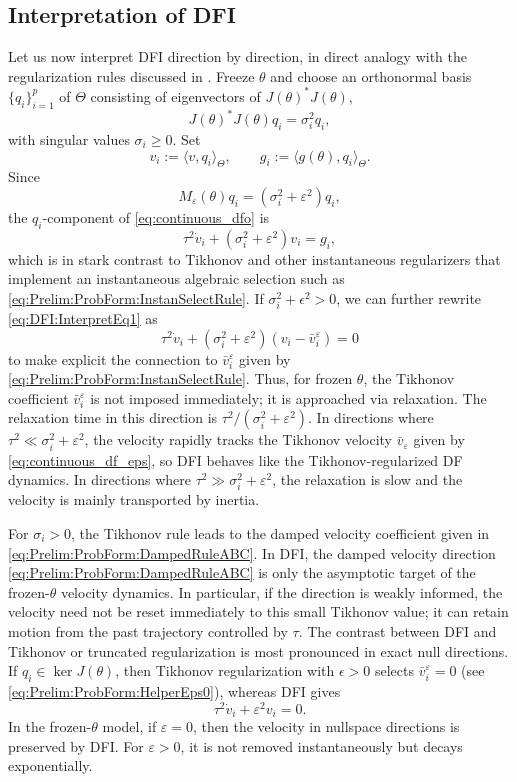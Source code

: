 \documentclass[oneside,11pt]{article}
\theoremstyle{remark}
\theoremstyle{thmstyleone}
\theoremstyle{thmstylethree}
\theoremstyle{thmstyletwo}
\newcommand{\ip}[2]{\langle #1,#2\rangle}
\begin{document}
\subsection{Interpretation of DFI}\label{sec:DFI:Interpretation}
Let us now interpret DFI direction by direction, in direct analogy with the regularization rules discussed in .  
Freeze $\theta$ and choose an orthonormal basis $\{q_i\}_{i=1}^p$ of $\Theta$ consisting of eigenvectors of $J(\theta)^*J(\theta)$,
\[
J(\theta)^*J(\theta)q_i=\sigma_i^2q_i,
\]
with singular values $\sigma_i\ge 0$. 
Set
\[
  v_i:=\ip{v}{q_i}_\Theta,
  \qquad
  g_i:=\ip{g(\theta)}{q_i}_\Theta .
\]
Since
\[
  M_\varepsilon(\theta)q_i=(\sigma_i^2+\varepsilon^2)q_i,
\]
the $q_i$-component of \eqref{eq:continuous_dfo} is
\begin{equation}\label{eq:DFI:InterpretEq1}
  \tau^2 \dot v_i+(\sigma_i^2+\varepsilon^2)v_i=g_i ,
\end{equation}
which is in stark contrast to Tikhonov and other instantaneous regularizers that implement an instantaneous algebraic selection such as \eqref{eq:Prelim:ProbForm:InstanSelectRule}. If $\sigma_i^2 + \epsilon^2 > 0$, we can further rewrite \eqref{eq:DFI:InterpretEq1} as
\[
  \tau^2 \dot v_i
  +
  (\sigma_i^2+\varepsilon^2)(v_i-\bar v_i^\varepsilon)
  =
  0 
\]
to make explicit the connection to $\bar{v}_i^{\varepsilon}$ given by \eqref{eq:Prelim:ProbForm:InstanSelectRule}.  Thus, for frozen $\theta$, the Tikhonov coefficient $\bar v_i^\varepsilon$ is not imposed immediately; it is approached via relaxation. The relaxation time in this direction is $\tau^2/(\sigma_i^2+\varepsilon^2)$.
        In directions where $\tau^2 \ll \sigma_i^2+\varepsilon^2$, the velocity rapidly tracks the Tikhonov velocity $\bar{v}_{\varepsilon}$ given by \eqref{eq:continuous_df_eps}, so DFI behaves like the Tikhonov-regularized DF dynamics.
        In directions where $\tau^2 \gg \sigma_i^2+\varepsilon^2$, the relaxation is slow and the velocity is mainly transported by inertia.


For $\sigma_i>0$, the Tikhonov rule leads to the  damped velocity coefficient given in \eqref{eq:Prelim:ProbForm:DampedRuleABC}. 
In DFI, the damped velocity direction  \eqref{eq:Prelim:ProbForm:DampedRuleABC} is only the asymptotic target of the frozen-$\theta$ velocity dynamics. In particular, if the direction is weakly informed, the velocity need not be reset immediately to this small Tikhonov value; it can retain motion from the past trajectory controlled by $\tau$. The contrast between DFI and Tikhonov or truncated regularization is most pronounced in exact null directions.  If $q_i\in\ker J(\theta)$, then 
Tikhonov regularization with $\epsilon > 0$ selects $\bar{v}_i^{\varepsilon} = 0$ (see \eqref{eq:Prelim:ProbForm:HelperEps0}), 
whereas  DFI gives
\[
  \tau^2\dot v_i+\varepsilon^2 v_i=0 .
\]
In the frozen-$\theta$ model, if $\varepsilon=0$, then the velocity in nullspace directions is preserved by DFI. For $\varepsilon>0$, it is not removed instantaneously but decays exponentially. 
\end{document}
